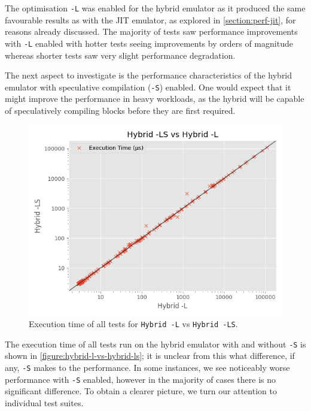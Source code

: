 The optimisation \texttt{-L} was enabled for the hybrid emulator as it produced the same favourable results as with the JIT emulator, as explored in \autoref{section:perf-jit}, for reasons already discussed. The majority of tests saw performance improvements with \texttt{-L} enabled with hotter tests seeing improvements by orders of magnitude whereas shorter tests saw very slight performance degradation.

The next aspect to investigate is the performance characteristics of the hybrid emulator with speculative compilation (\texttt{-S}) enabled. One would expect that it might improve the performance in heavy workloads, as the hybrid will be capable of speculatively compiling blocks before they are first required. 

\begin{figure}[H]
    \centering
    \includegraphics[scale=0.75]{output/graphs/scatter/vs/Hybrid -L-vs-Hybrid -LS-time.png}
    \caption{Execution time of all tests for \texttt{Hybrid -L} vs \texttt{Hybrid -LS}.}
    \label{figure:hybrid-l-vs-hybrid-ls}
\end{figure}

The execution time of all tests run on the hybrid emulator with and without \texttt{-S} is shown in \autoref{figure:hybrid-l-vs-hybrid-ls}; it is unclear from this what difference, if any, \texttt{-S} makes to the performance. In some instances, we see noticeably worse performance with \texttt{-S} enabled, however in the majority of cases there is no significant difference. To obtain a clearer picture, we turn our attention to individual test suites.

